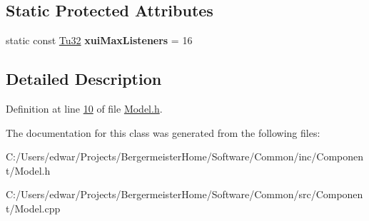 \subsection*{Static Protected Attributes}
\begin{DoxyCompactItemize}
\item 
\mbox{\label{class_g_n_common_1_1_n_component_1_1_tc_model_a43cf22126d322790c5e15239ed00682a}} 
static const \mbox{\hyperlink{namespace_g_n_common_a941b527ef318f318aed7903dc832b7e4}{Tu32}} {\bfseries xui\+Max\+Listeners} = 16
\end{DoxyCompactItemize}


\subsection{Detailed Description}


Definition at line \mbox{\hyperlink{_model_8h_source_l00010}{10}} of file \mbox{\hyperlink{_model_8h_source}{Model.\+h}}.



The documentation for this class was generated from the following files\+:\begin{DoxyCompactItemize}
\item 
C\+:/\+Users/edwar/\+Projects/\+Bergermeister\+Home/\+Software/\+Common/inc/\+Component/Model.\+h\item 
C\+:/\+Users/edwar/\+Projects/\+Bergermeister\+Home/\+Software/\+Common/src/\+Component/Model.\+cpp\end{DoxyCompactItemize}
